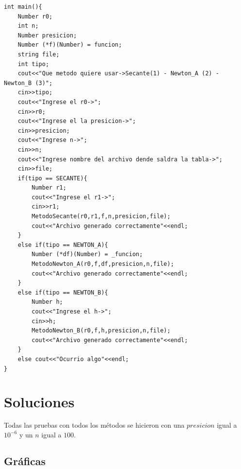 \documentclass[a4paper,12pt]{article}
\begin{document}
\begin{lstlisting}
int main(){
	Number r0;
	int n;
	Number presicion;
	Number (*f)(Number) = funcion;
	string file;
	int tipo;
	cout<<"Que metodo quiere usar->Secante(1) - Newton_A (2) - Newton_B (3)";
	cin>>tipo;
	cout<<"Ingrese el r0->";
	cin>>r0;
	cout<<"Ingrese el la presicion->";
	cin>>presicion;
	cout<<"Ingrese n->";
	cin>>n;
	cout<<"Ingrese nombre del archivo dende saldra la tabla->";
	cin>>file;
	if(tipo == SECANTE){
		Number r1;
		cout<<"Ingrese el r1->";
		cin>>r1;
		MetodoSecante(r0,r1,f,n,presicion,file);
		cout<<"Archivo generado correctamente"<<endl;
	}
	else if(tipo == NEWTON_A){
		Number (*df)(Number) = _funcion;
		MetodoNewton_A(r0,f,df,presicion,n,file);
		cout<<"Archivo generado correctamente"<<endl;
	}
	else if(tipo == NEWTON_B){
		Number h;
		cout<<"Ingrese el h->";
		cin>>h;
		MetodoNewton_B(r0,f,h,presicion,n,file);
		cout<<"Archivo generado correctamente"<<endl;
	}
	else cout<<"Ocurrio algo"<<endl;
}
  \end{lstlisting}

  \newpage
  
  \section{Soluciones}
  
    Todas las pruebas con todos los métodos se hicieron con una $presicion$ igual a $10^{-6}$ y un $n$ igual a $100$. 
  
    \subsection{Gráficas}
    
\end{document}
